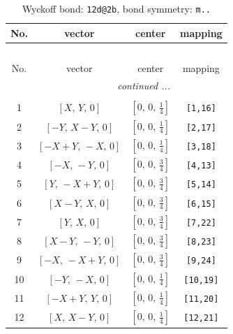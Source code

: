 \documentclass[fleqn,8pt]{jsarticle}
\begin{document}
\begin{longtable}{cccc}
\caption{Wyckoff bond: {\tt 12d@2b}, bond symmetry: {\tt m..}}
 \\
 \hline \hline
No. & vector & center & mapping \\ \hline \endfirsthead

\multicolumn{3}{l}{\tablename\ \thetable{}} \\
 \hline \hline
No. & vector & center & mapping \\ \hline \endhead

 \hline \hline
\multicolumn{3}{r}{\footnotesize\it continued ...} \\ \endfoot

 \hline \hline
\multicolumn{3}{r}{} \\ \endlastfoot

1 & $\left[ X,\, Y,\, 0 \right]$ & $\left[ 0,\, 0,\, \frac{1}{4} \right]$ & {\tt [1,16]} \\ \hline
2 & $\left[ - Y,\, X - Y,\, 0 \right]$ & $\left[ 0,\, 0,\, \frac{1}{4} \right]$ & {\tt [2,17]} \\ \hline
3 & $\left[ - X + Y,\, - X,\, 0 \right]$ & $\left[ 0,\, 0,\, \frac{1}{4} \right]$ & {\tt [3,18]} \\ \hline
4 & $\left[ - X,\, - Y,\, 0 \right]$ & $\left[ 0,\, 0,\, \frac{3}{4} \right]$ & {\tt [4,13]} \\ \hline
5 & $\left[ Y,\, - X + Y,\, 0 \right]$ & $\left[ 0,\, 0,\, \frac{3}{4} \right]$ & {\tt [5,14]} \\ \hline
6 & $\left[ X - Y,\, X,\, 0 \right]$ & $\left[ 0,\, 0,\, \frac{3}{4} \right]$ & {\tt [6,15]} \\ \hline
7 & $\left[ Y,\, X,\, 0 \right]$ & $\left[ 0,\, 0,\, \frac{3}{4} \right]$ & {\tt [7,22]} \\ \hline
8 & $\left[ X - Y,\, - Y,\, 0 \right]$ & $\left[ 0,\, 0,\, \frac{3}{4} \right]$ & {\tt [8,23]} \\ \hline
9 & $\left[ - X,\, - X + Y,\, 0 \right]$ & $\left[ 0,\, 0,\, \frac{3}{4} \right]$ & {\tt [9,24]} \\ \hline
10 & $\left[ - Y,\, - X,\, 0 \right]$ & $\left[ 0,\, 0,\, \frac{1}{4} \right]$ & {\tt [10,19]} \\ \hline
11 & $\left[ - X + Y,\, Y,\, 0 \right]$ & $\left[ 0,\, 0,\, \frac{1}{4} \right]$ & {\tt [11,20]} \\ \hline
12 & $\left[ X,\, X - Y,\, 0 \right]$ & $\left[ 0,\, 0,\, \frac{1}{4} \right]$ & {\tt [12,21]} \\
\end{longtable}
\end{document}
